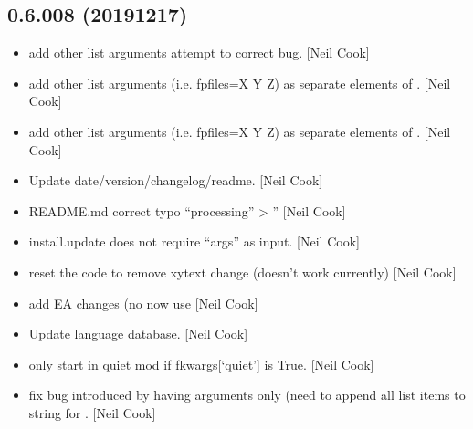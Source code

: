 \documentclass[a4paper,10pt,english]{report}
\begin{document}
\subsection{0.6.008 (2019\sphinxhyphen{}12\sphinxhyphen{}17)}
\label{\detokenize{misc/changelog:id29}}\begin{itemize}
\item {} 
 \sphinxhyphen{} add other list arguments \textendash{} attempt to
correct bug. {[}Neil Cook{]}

\item {} 
 \sphinxhyphen{} add other list arguments (i.e. \textendash{}fpfiles=X Y
Z) as separate elements of . {[}Neil Cook{]}

\item {} 
 \sphinxhyphen{} add other list arguments (i.e. \textendash{}fpfiles=X Y
Z) as separate elements of . {[}Neil Cook{]}

\item {} 
Update date/version/changelog/readme. {[}Neil Cook{]}

\item {} 
README.md \sphinxhyphen{} correct typo “processing” \textendash{}\textgreater{} ” {[}Neil
Cook{]}

\item {} 
 \sphinxhyphen{} install.update does not require “args” as input.
{[}Neil Cook{]}

\item {} 
 \sphinxhyphen{} reset the code to remove xytext change (doesn’t work
currently) {[}Neil Cook{]}

\item {} 
 \sphinxhyphen{} add EA changes (no  now use
 {[}Neil Cook{]}

\item {} 
Update language database. {[}Neil Cook{]}

\item {} 
 \sphinxhyphen{} only start in quiet mod if fkwargs{[}‘quiet’{]}
is True. {[}Neil Cook{]}

\item {} 
 \sphinxhyphen{} fix bug introduced by having \textendash{}arguments
only (need to append all list items to string for .
{[}Neil Cook{]}


\end{itemize}
\end{document}
